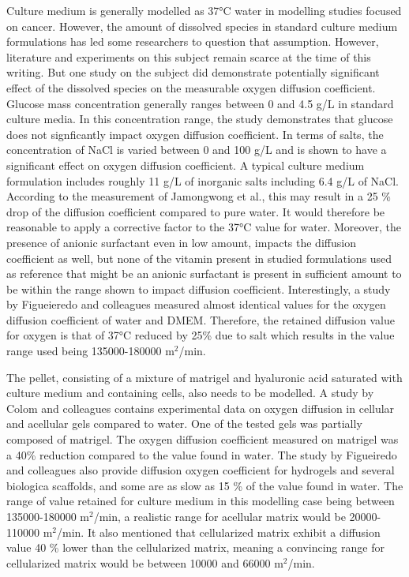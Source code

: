 \documentclass[11pt,a4paper]{article}
\begin{document}
Culture medium is generally modelled as 37°C water in modelling studies focused on cancer.\cite{Mao2018}\cite{Kempf2005}\cite{Bull2020}\cite{Jagiella2016} However, the amount of dissolved species in standard culture medium formulations has led some researchers to question that assumption. However, literature and experiments on this subject remain scarce at the time of this writing. But one study on the subject did demonstrate potentially significant effect of the dissolved species on the measurable oxygen diffusion coefficient.\cite{Jamongwong2010} Glucose mass concentration generally ranges between 0 and 4.5 g/L in standard culture media. In this concentration range, the study demonstrates that glucose does not signficantly impact oxygen diffusion coefficient. In terms of salts, the concentration of NaCl is varied between 0 and 100  g/L and is shown to have a significant effect on oxygen diffusion coefficient. A typical culture medium formulation includes roughly 11 g/L of inorganic salts including 6.4 g/L of NaCl. According to the measurement of Jamongwong et al., this may result in a 25 \% drop of the diffusion coefficient compared to pure water. It would therefore be reasonable to apply a corrective factor to the 37°C value for water. Moreover, the presence of anionic surfactant even in low amount, impacts the diffusion coefficient as well, but none of the vitamin present in studied formulations used as reference that might be an anionic surfactant is present in sufficient amount to be within the range shown to impact diffusion coefficient. Interestingly, a study by Figueieredo and colleagues measured almost identical values for the oxygen diffusion coefficient of water and DMEM.\cite{Figueiredo2018} Therefore, the retained diffusion value for oxygen is that of 37°C reduced by 25\% due to salt which results in the value range used being 135000-180000 \textmu m$^2$/min.

The pellet, consisting of a mixture of matrigel and hyaluronic acid saturated with culture medium and containing cells, also needs to be modelled. A study by Colom and colleagues contains experimental data on oxygen diffusion in cellular and acellular gels compared to water.\cite{Colom2014} One of the tested gels was partially composed of matrigel. The oxygen diffusion coefficient measured on matrigel was a 40\% reduction compared to the value found in water. The study by Figueiredo and colleagues also provide diffusion oxygen coefficient for hydrogels and several biologica scaffolds, and some are as slow as 15 \% of the value found in water.\cite{Figueiredo2018} The range of value retained for culture medium in this modelling case being between 135000-180000 \textmu m$^2$/min, a realistic range for acellular matrix would be 20000-110000 \textmu m$^2$/min. It also mentioned that cellularized matrix exhibit a diffusion value 40 \% lower than the cellularized matrix, meaning a convincing range for cellularized matrix would be between 10000 and 66000 \textmu m$^2$/min.
\end{document}
